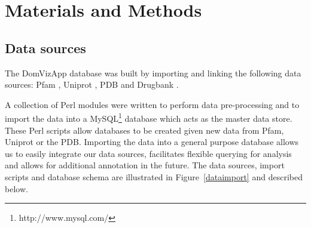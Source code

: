 \section{Materials and Methods}

% 


\subsection{Data sources}

The DomVizApp database was built by importing and linking the following data sources: Pfam \cite{pfamdb}, Uniprot \cite{uniprot}, PDB \cite{pdb} and Drugbank \cite{drugbank}.

A collection of Perl modules were written to perform data pre-processing and to import the data into a MySQL\footnote{http://www.mysql.com/} database which acts as the master data store. These Perl scripts allow databases to be created given new data from Pfam, Uniprot or the PDB. Importing the data into a general purpose database allows us to easily integrate our data sources, facilitates flexible querying for analysis and allows for additional annotation in the future. The data sources, import scripts and database schema are illustrated in Figure~\ref{dataimport} and described below.  

